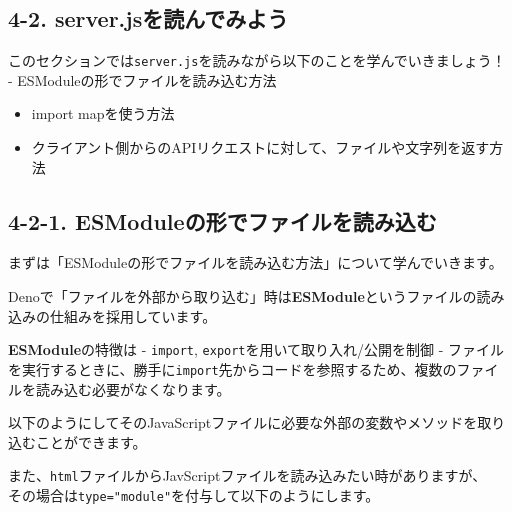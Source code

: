 \subsection{4-2.
server.jsを読んでみよう}\label{server.jsux3092ux8aadux3093ux3067ux307fux3088ux3046}

このセクションでは\texttt{server.js}を読みながら以下のことを学んでいきましょう！
- ESModuleの形でファイルを読み込む方法

\begin{itemize}
\item
  import mapを使う方法
\item
  クライアント側からのAPIリクエストに対して、ファイルや文字列を返す方法
\end{itemize}

\subsection{4-2-1.
ESModuleの形でファイルを読み込む}\label{esmoduleux306eux5f62ux3067ux30d5ux30a1ux30a4ux30ebux3092ux8aadux307fux8fbcux3080}

まずは「ESModuleの形でファイルを読み込む方法」について学んでいきます。

Denoで「ファイルを外部から取り込む」時は\textbf{ESModule}というファイルの読み込みの仕組みを採用しています。

\textbf{ESModule}の特徴は - \texttt{import},
\texttt{export}を用いて取り入れ/公開を制御 -
ファイルを実行するときに、勝手に\texttt{import}先からコードを参照するため、複数のファイルを読み込む必要がなくなります。

以下のようにしてそのJavaScriptファイルに必要な外部の変数やメソッドを取り込むことができます。

\begin{Shaded}
\begin{Highlighting}[]
\NormalTok{ \{ }\OperatorTok{\textless{}}\OperatorTok{\textgreater{},} \OperatorTok{\textless{}}\OperatorTok{\textgreater{}}\NormalTok{ \} } 
\end{Highlighting}
\end{Shaded}

また、\texttt{html}ファイルからJavScriptファイルを読み込みたい時がありますが、\\
その場合は\texttt{type="module"}を付与して以下のようにします。

\begin{Shaded}
\begin{Highlighting}[]
\DataTypeTok{\textless{}}\OperatorTok{=}\ErrorTok{\textless{}}\DataTypeTok{\textgreater{}\textless{}/}\DataTypeTok{\textgreater{}}
\end{Highlighting}
\end{Shaded}

